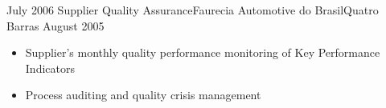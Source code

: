 \begin{experiences}
{                    }
                    
  \emptySeparator            
  \experience
  {July 2006}    {Supplier Quality Assurance}{Faurecia Automotive do Brasil}{Quatro Barras}
  {August 2005}  {
                      \begin{itemize}
                        \item Supplier's monthly quality performance monitoring of Key Performance Indicators
                        \item Process auditing and quality crisis management
                      \end{itemize}
                    }
                
  \emptySeparator
\end{experiences}
